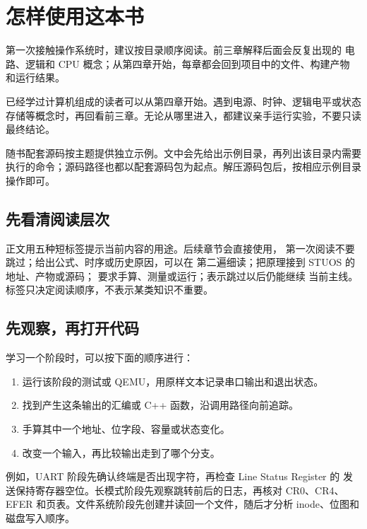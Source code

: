 \chapter*{怎样使用这本书}

第一次接触操作系统时，建议按目录顺序阅读。前三章解释后面会反复出现的
电路、逻辑和 CPU 概念；从第四章开始，每章都会回到项目中的文件、构建产物
和运行结果。

已经学过计算机组成的读者可以从第四章开始。遇到电源、时钟、逻辑电平或状态
存储等概念时，再回看前三章。无论从哪里进入，都建议亲手运行实验，不要只读
最终结论。

随书配套源码按主题提供独立示例。文中会先给出示例目录，再列出该目录内需要
执行的命令；源码路径也都以配套源码包为起点。解压源码包后，按相应示例目录
操作即可。

\section*{先看清阅读层次}

正文用五种短标签提示当前内容的用途。\mustunderstand 后续章节会直接使用，
第一次阅读不要跳过；\deepunderstanding 给出公式、时序或历史原因，可以在
第二遍细读；\projectconnection 把原理接到 STUOS 的地址、产物或源码；
\handsonexperiment 要求手算、测量或运行；\maybeskip 表示跳过以后仍能继续
当前主线。标签只决定阅读顺序，不表示某类知识不重要。

\section*{先观察，再打开代码}

学习一个阶段时，可以按下面的顺序进行：

\begin{enumerate}[leftmargin=2.2em]
  \item 运行该阶段的测试或 QEMU，用原样文本记录串口输出和退出状态。
  \item 找到产生这条输出的汇编或 C++ 函数，沿调用路径向前追踪。
  \item 手算其中一个地址、位字段、容量或状态变化。
  \item 改变一个输入，再比较输出走到了哪个分支。
\end{enumerate}

例如，UART 阶段先确认终端是否出现字符，再检查 Line Status Register 的
发送保持寄存器空位。长模式阶段先观察跳转前后的日志，再核对 CR0、CR4、
EFER 和页表。文件系统阶段先创建并读回一个文件，随后才分析 inode、位图和
磁盘写入顺序。

